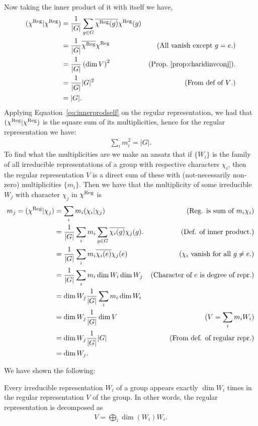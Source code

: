 Now taking the inner product of it with itself we have,
\begin{align*}
	(\chi^{\text{Reg}}|\chi^{\text{Reg}}) &= \frac{1}{|G|} \sum_{g \in G} \overline{\chi^{\text{Reg}}(g)}\chi^{\text{Reg}}(g) \\
	&=  \frac{1}{|G|}  \overline{\chi^{\text{Reg}}}\chi^{\text{Reg}} & \text{(All vanish except $g=e$.)} \\
	&= \frac{1}{|G|} \left(\dim V \right)^2  & \text{(Prop.~\ref{prop:charidinvconj}).}\\
	&= \frac{1}{|G|}|G|^2 & \text{(From def of $V$.)} \\
	&= |G|.
\end{align*}
Applying Equation~\ref{eq:innerprodself} on the regular representation, we had  that $(\chi^{\text{Reg}}|\chi^{\text{Reg}}) $ is the square sum of its multiplicities, hence for the regular representation we have:
\begin{align}\label{eq:sqsummult}
	\sum_i m_i^2 = |G|.
\end{align}
To find what the multiplicities are we make an ansatz that if $\{W_i\}$ is the family of all irreducible representations of a group with respective characters $\chi_i$, then the regular representation $V$ is a direct sum of these with (not-necessarily non-zero) multiplicities $\{m_i\}$. Then we have that the multiplicity of some irreducible $W_j$ with character $\chi_j$ in $\chi^{\text{Reg}}$ is
\begin{align*}
	m_j = (\chi^{\text{Reg}}|\chi_j)  &=  \sum_i m_i  (\chi_i|\chi_j)   & \text{(Reg. is sum of $m_i\chi_i$)}\\
	&= \frac{1}{|G|} \sum_i  m_i \sum_{g \in G} \overline{\chi_i(g) }{\chi_j(g)}. & \text{(Def. of inner product.)} \\
	&=  \frac{1}{|G|}\sum_i  m_i \overline{\chi_i(e) }{\chi_j(e)} & \text{($\chi_i$ vanish for all $g \neq e$.)} \\
	&= \frac{1}{|G|} \sum_i m_i \dim W_i \dim W_j & \text{(Character of $e$ is degree of repr.)} \\
	&= \dim W_j \frac{1}{|G|}  \sum_i m_i \dim W_i  & \\
		&= \dim W_j \frac{1}{|G|} \dim V & \text{($V = \sum_i m_i W_i$)} \\
	&= \dim W_j \frac{1}{|G|}  |G| & \text{(From def. of regular repr.)} \\
	& = \dim W_j.
\end{align*}

We have shown the following:
\begin{theorem}\label{thm:regreprmult}
	Every irreducible representation $W_i$ of a group appears exactly $\dim W_i$ times in the regular representation $V$ of the group. In other words, the regular representation is decomposed as
	\begin{align*}
		V = \bigoplus_i \dim (W_i) W_i.
	\end{align*}
\end{theorem}

